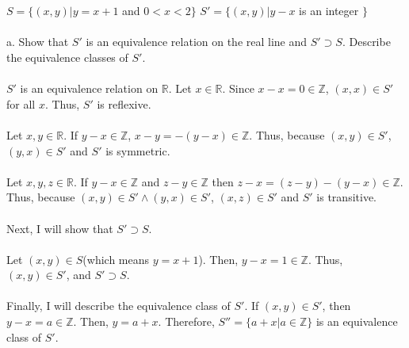 \documentclass[]{article}
\begin{document}
\begin{enumerate}
    \\\\ $S=\{(x,y)|y=x+1$ and $0<x<2\}$
    \newline $S'=\{(x,y)|y-x$ is an integer $\}$
    \\\\a. Show that $S'$ is an equivalence relation on the real line and $S' \supset S$. Describe the equivalence classes of $S'$.
    \\\\$S'$ is an equivalence relation on $\mathbb{R}$. Let $x \in \mathbb{R}$. Since $x-x=0 \in \mathbb{Z}$, $(x,x) \in S'$ for all $x$. Thus, $S'$ is reflexive. 
    \\\\Let $x,y \in \mathbb{R}$. If $y-x \in \mathbb{Z}$, $x-y=-(y-x) \in \mathbb{Z}$. Thus, because $(x,y) \in S'$, $(y,x) \in S'$ and $S'$ is symmetric. 
    \\\\Let $x,y,z \in \mathbb{R}$. If $y-x \in \mathbb{Z}$ and $z-y \in \mathbb{Z}$ then $z-x=(z-y)-(y-x) \in \mathbb{Z}$. Thus, because $(x,y) \in S' \land (y,x) \in S'$, $(x,z) \in S'$ and $S'$ is transitive.
    \\\\Next, I will show that $S' \supset S$.
    \\\\Let $(x,y) \in S$(which means $y=x+1$). Then, $y-x=1 \in \mathbb{Z}$. Thus, $(x,y) \in S'$, and $S' \supset S$. 
    \\\\Finally, I will describe the equivalence class of $S'$. If $(x,y) \in S'$, then $y-x=a \in \mathbb{Z}$. Then, $y=a+x$. Therefore, $S'' = \{a+x|a \in \mathbb{Z}\}$ is an equivalence class of $S'$.

\end{enumerate}
\end{document}
